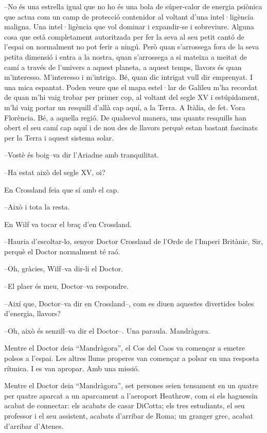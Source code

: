 --No és una estrella igual que no ho és una bola de súper-calor de
energia psiònica que actua com un camp de protecció contenidor al
voltant d'una intel·ligència maligna. Una intel·ligència que vol dominar
i expandir-se i sobreviure. Alguna cosa que està completament
autoritzada per fer la seva al seu petit cantó de l'espai on normalment
no pot ferir a ningú. Però quan s'arrossega fora de la seva petita
dimensió i entra a la nostra, quan s'arrossega a si mateixa a meitat de
camí a través de l'univers a aquest planeta, a aquest temps, llavors és
quan m'interesso. M'interesso i m'intrigo. Bé, quan dic intrigat vull
dir emprenyat. I una mica espantat. Poden veure que el mapa estel·lar de
Galileu m'ha recordat de quan m'hi vaig trobar per primer cop, al
voltant del segle XV i estúpidament, m'hi vaig portar un resquill d'allà
cap aquí, a la Terra. A Itàlia, de fet. Vora Florència. Bé, a aquella
regió. De qualsevol manera, uns quants resquills han obert el seu camí
cap aquí i de nou des de llavors perquè estan bastant fascinats per la
Terra i aquest sistema solar.

--Vostè és boig--va dir l'Ariadne amb tranquilitat.

--Ha estat això del segle XV, oi?

En Crossland feia que sí amb el cap.

--Això i tota la resta.

En Wilf va tocar el braç d'en Crossland.

--Hauria d'escoltar-lo, senyor Doctor Crossland de l'Orde de l'Imperi
Britànic, Sir, perquè el Doctor normalment té raó.

--Oh, gràcies, Wilf--va dir-li el Doctor.

--El plaer és meu, Doctor--va respondre.

--Així que, Doctor--va dir en Crossland--, com es diuen aquestes
divertides boles d'energia, llavors?

--Oh, això és senzill--va dir el Doctor--. Una paraula. Mandràgora.

Mentre el Doctor deia ``Mandràgora'', el Cos del Caos va començar a
emetre polsos a l'espai. Les altres llums properes van començar a polsar
en una resposta rítmica. I es van apropar. Amb una missió.

Mentre el Doctor deia ``Mandràgora'', set persones seien tensament en un
quatre per quatre aparcat a un aparcament a l'aeroport Heathrow, com si
els haguessin acabat de connectar: els acabats de casar DiCotta; els
tres estudiants, el seu professor i el seu assistent, acabats d'arribar
de Roma; un granger grec, acabat d'arribar d'Atenes.

